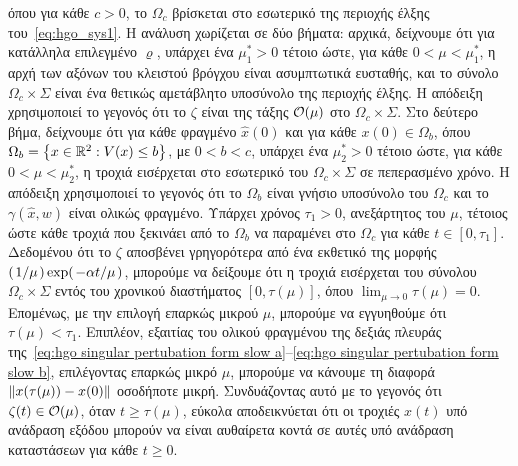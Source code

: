 όπου για κάθε $c >0$, το $\Omega_c$ βρίσκεται στο εσωτερικό της περιοχής έλξης του~\eqref{eq:hgo_sys1}. Η ανάλυση χωρίζεται σε δύο βήματα: αρχικά, δείχνουμε ότι για κατάλληλα επιλεγμένο $\varrho$, υπάρχει ένα $\mu_1^*>0$ τέτοιο ώστε, για κάθε $0 < \mu < \mu_1^*$, η αρχή των αξόνων του κλειστού βρόγχου είναι ασυμπτωτικά ευσταθής, και το σύνολο $\Omega_c \times \Sigma$ είναι ένα θετικώς αμετάβλητο υποσύνολο της περιοχής έλξης. Η απόδειξη χρησιμοποιεί το γεγονός ότι το $\zeta$ είναι της τάξης $\bigo \mu$ στο $\Omega_c \times \Sigma$. Στο δεύτερο βήμα, δείχνουμε ότι για κάθε φραγμένο $\hat x(0)$ και για κάθε $x(0) \in \Omega_b$, όπου $\Omega_b = \qty{x \in \mathbb{R}^2: V(x) \leq b}$, με $0 < b < c$, υπάρχει ένα $\mu_2^*>0$ τέτοιο ώστε, για κάθε $0 < \mu < \mu_2^*$, η τροχιά εισέρχεται στο εσωτερικό του $\Omega_c\times \Sigma$ σε πεπερασμένο χρόνο. H απόδειξη χρησιμοποιεί το γεγονός ότι το $\Omega_b$ είναι γνήσιο υποσύνολο του $\Omega_c$ και το $\gamma(\hat x, w)$ είναι ολικώς φραγμένο. Υπάρχει χρόνος $\tau_1 > 0$, ανεξάρτητος του $\mu$, τέτοιος ώστε κάθε τροχιά που ξεκινάει από το $\Omega_b$ να παραμένει στο $\Omega_c$ για κάθε $t \in [0, \tau_1]$. Δεδομένου ότι το $\zeta$ αποσβένει γρηγορότερα από ένα εκθετικό της μορφής $(\flatfrac{1}{\mu}) \exp(\flatfrac{-\alpha t}{\mu})$, μπορούμε να δείξουμε ότι η τροχιά εισέρχεται του σύνολου $\Omega_c \times \Sigma$ εντός του χρονικού διαστήματος $[0, \tau(\mu)]$, όπου $\lim_{\mu \rightarrow 0}\tau(\mu) =0$. Επομένως, με την επιλογή επαρκώς μικρού $\mu$, μπορούμε να εγγυηθούμε ότι $\tau(\mu) < \tau_1$. Επιπλέον, εξαιτίας του ολικού φραγμένου της δεξιάς πλευράς της~\eqref{eq:hgo singular pertubation form slow a}--\eqref{eq:hgo singular pertubation form slow b}, επιλέγοντας επαρκώς μικρό $\mu$, μπορούμε να κάνουμε τη διαφορά $\norm{x(\tau(\mu)) - x(0)}$ οσοδήποτε μικρή. Συνδυάζοντας αυτό με το γεγονός ότι $\zeta(t) \in \bigo \mu$, όταν $t \geq \tau(\mu)$, εύκολα αποδεικνύεται ότι οι τροχιές $x(t)$ υπό ανάδραση εξόδου μπορούν να είναι αυθαίρετα κοντά σε αυτές υπό ανάδραση καταστάσεων για κάθε $t \geq 0$.


